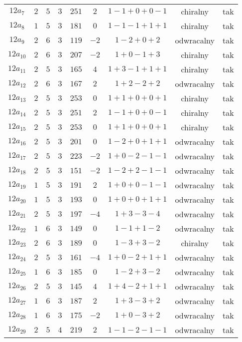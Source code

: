 \begin{longtable}{ccccccccc}
$12a_{7}$ & $2$ & $5$ & $3$ & $251$ & $2$ & $1-1+0+0-1$ & chiralny & tak \\
$12a_{8}$ & $1$ & $5$ & $3$ & $181$ & $0$ & $1-1-1+1+1$ & chiralny & tak \\
$12a_{9}$ & $2$ & $6$ & $3$ & $119$ & $-2$ & $1-2+0+2$ & odwracalny & tak \\
$12a_{10}$ & $2$ & $6$ & $3$ & $207$ & $-2$ & $1+0-1+3$ & chiralny & tak \\
$12a_{11}$ & $2$ & $5$ & $3$ & $165$ & $4$ & $1+3-1+1+1$ & chiralny & tak \\
$12a_{12}$ & $2$ & $6$ & $3$ & $167$ & $2$ & $1+2-2+2$ & odwracalny & tak \\
$12a_{13}$ & $2$ & $5$ & $3$ & $253$ & $0$ & $1+1+0+0+1$ & chiralny & tak \\
$12a_{14}$ & $2$ & $5$ & $3$ & $251$ & $2$ & $1-1+0+0-1$ & chiralny & tak \\
$12a_{15}$ & $2$ & $5$ & $3$ & $253$ & $0$ & $1+1+0+0+1$ & chiralny & tak \\
$12a_{16}$ & $2$ & $5$ & $3$ & $201$ & $0$ & $1-2+0+1+1$ & odwracalny & tak \\
$12a_{17}$ & $2$ & $5$ & $3$ & $223$ & $-2$ & $1+0-2-1-1$ & odwracalny & tak \\
$12a_{18}$ & $2$ & $5$ & $3$ & $151$ & $-2$ & $1-2+2-1-1$ & odwracalny & tak \\
$12a_{19}$ & $1$ & $5$ & $3$ & $191$ & $2$ & $1+0+0-1-1$ & odwracalny & tak \\
$12a_{20}$ & $1$ & $5$ & $3$ & $193$ & $0$ & $1+0+0+1+1$ & odwracalny & tak \\
$12a_{21}$ & $2$ & $5$ & $3$ & $197$ & $-4$ & $1+3-3-4$ & odwracalny & tak \\
$12a_{22}$ & $1$ & $6$ & $3$ & $149$ & $0$ & $1-1+1-2$ & odwracalny & tak \\
$12a_{23}$ & $2$ & $6$ & $3$ & $189$ & $0$ & $1-3+3-2$ & chiralny & tak \\
$12a_{24}$ & $2$ & $5$ & $3$ & $161$ & $-4$ & $1+0-2+1+1$ & odwracalny & tak \\
$12a_{25}$ & $1$ & $6$ & $3$ & $185$ & $0$ & $1-2+3-2$ & odwracalny & tak \\
$12a_{26}$ & $2$ & $5$ & $3$ & $145$ & $4$ & $1+4-2+1+1$ & odwracalny & tak \\
$12a_{27}$ & $1$ & $6$ & $3$ & $187$ & $2$ & $1+3-3+2$ & odwracalny & tak \\
$12a_{28}$ & $1$ & $6$ & $3$ & $175$ & $-2$ & $1+0-3+2$ & odwracalny & tak \\
$12a_{29}$ & $2$ & $5$ & $4$ & $219$ & $2$ & $1-1-2-1-1$ & odwracalny & tak \\

\end{longtable}
